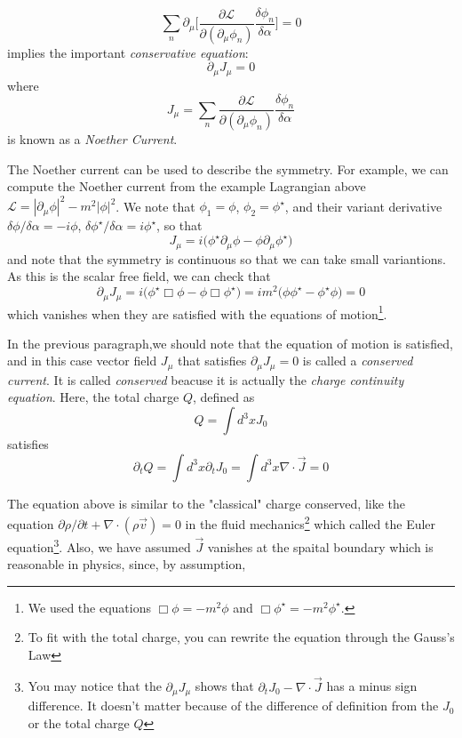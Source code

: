 \documentclass[12pt,openany]{book}
\begin{document}
	\begin{equation}
		\sum_{n}\partial_\mu\big[\frac{\partial\mathcal{L}}{\partial(\partial_\mu\phi_n)}\frac{\delta\phi_n}{\delta\alpha}\big]=0
	\end{equation} 
	implies the important \textit{conservative equation}:
	\begin{equation}
		\boxed{\partial_\mu J_\mu=0}
	\end{equation}
	where 
	\begin{equation}
		\boxed{J_\mu=\sum_n\frac{\partial\mathcal{L}}{\partial(\partial_\mu\phi_n)}\frac{\delta\phi_n}{\delta\alpha}}
	\end{equation}
	is known as a \textit{ Noether Current}.\par 
	The Noether current can be used to describe the symmetry. For example, we can 
	compute the Noether current from the example Lagrangian above $\mathcal{L}=|\partial_\mu\phi|^2-m^2|\phi|^2$. We note that $\phi_1=\phi$, $\phi_2=\phi^\star$, and their 
	variant derivative $\delta\phi/\delta\alpha=-i\phi$, $\delta\phi^\star/\delta\alpha=i\phi^\star$, so that
	\begin{equation}
		J_\mu=i\big(\phi^\star\partial_\mu\phi-\phi\partial_\mu\phi^\star\big)
	\end{equation}
	and note that the symmetry is continuous so that we can take small variantions. As this is the scalar free field, we can check that
	\begin{equation}
		\partial_\mu J_\mu=i\big(\phi^\star\Box\phi-\phi\Box\phi^\star\big)=im^2\big(\phi\phi^\star-\phi^\star\phi\big)=0
	\end{equation}
	which vanishes when they are satisfied with the equations of motion\footnote{We used the equations $\Box\phi=-m^2\phi$ and $\Box\phi^\star=-m^2\phi^\star$.}.\par 
	In the previous paragraph,we should note that the equation of motion is satisfied, and in this case vector field $J_\mu$ that satisfies $\partial_\mu J_\mu=0$ is called a
	\textit{conserved current}. It is called \textit{conserved} beacuse it is actually the \textit{charge continuity equation}. Here, the total charge $Q$, defined as
	\begin{equation}
		Q=\int d^3x J_0
	\end{equation}
	satisfies 
	\begin{equation}
		\partial_t Q=\int d^3 x\partial_t J_0=\int d^3x \nabla\cdot\vec{J}=0
	\end{equation}\par 
	The equation above is similar to the "classical" charge conserved, like the equation $\partial\rho/\partial t+\nabla\cdot(\rho\vec{v})=0$ in the fluid mechanics\footnote{To fit with the total charge, you can rewrite the equation through the Gauss's Law} which called the Euler equation\footnote{You may notice that the 
		$\partial_\mu J_\mu$ shows that $\partial_t J_0-\nabla\cdot\vec{J}$ has a minus sign difference. It doesn't matter because of the difference of definition from the $J_0$ or the total charge $Q$}. Also, we have assumed $\vec{J}$ vanishes at the spaital boundary which is reasonable in physics, since, by assumption,
\end{document}
